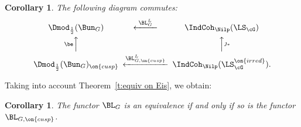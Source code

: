 \documentclass[9pt]{amsart}
\newtheorem{cor}[subsubsection]{Corollary}
\theoremstyle{remark}
\theoremstyle{definition}
\theoremstyle{remark}
\newcommand{\thmref}[1]{Theorem~\ref{#1}}
\numberwithin{equation}{section}
\begin{document}
\begin{cor}
The following diagram commutes:
\begin{equation} \label{e:LL cusp diagram in}
\CD
\Dmod_{\frac{1}{2}}(\Bun_G) @<{\BL^L_G}<< \IndCoh_\Nilp(\LS_\cG) \\
@A{\be}AA @AA{\jmath_*}A  \\
\Dmod_{\frac{1}{2}}(\Bun_G)_{\on{cusp}} @<{\BL^L_{G,\on{cusp}}}<<  \IndCoh_\Nilp(\LS^{\on{irred}}_\cG).
\endCD
\end{equation} 
\end{cor}

\sssec{}  \label{sss:reduce to cusp}

Taking into account \thmref{t:equiv on Eis}, we obtain:

\begin{cor} \label{c:reduce to cusp}
The functor $\BL_G$ is an equivalence if and only if so is the functor $\BL_{G,\on{cusp}}$.
\end{cor}
\end{document}
